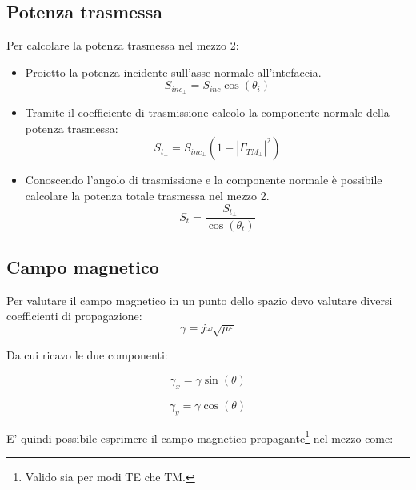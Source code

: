 		\subsection{Potenza trasmessa}

			Per calcolare la potenza trasmessa nel mezzo 2:
			
			\begin{itemize}
			
			\item Proietto la potenza incidente sull'asse normale all'intefaccia.
			\begin{equation}
			S_{inc_\perp}=S_{inc}\cos(\theta_i)
			\end{equation}

			\item Tramite il coefficiente di trasmissione calcolo la componente normale della potenza trasmessa:
			\begin{equation}
			S_{t_\perp}=S_{inc_\perp}(1-|\Gamma_{TM_\perp}|^2)
			\end{equation}

			\item Conoscendo l'angolo di trasmissione e la componente normale è possibile calcolare la potenza totale trasmessa nel mezzo 2.
			\begin{equation}
			S_{t}=\frac{S_{t_\perp}}{\cos(\theta_t)}
			\end{equation}
			

			\end{itemize}
		

		\subsection{Campo magnetico}

			Per valutare il campo magnetico in un punto dello spazio devo valutare diversi coefficienti di propagazione:
			\begin{equation}
			\gamma=j\omega\sqrt{\mu\epsilon}\end{equation}

			Da cui ricavo le due componenti:

			\begin{equation}
			\gamma_x=\gamma\sin(\theta)
			\end{equation}

			\begin{equation}
			\gamma_y=\gamma\cos(\theta)
			\end{equation}

			E' quindi possibile esprimere il campo magnetico propagante\footnote{Valido sia per modi TE che TM.} nel mezzo come:
			
